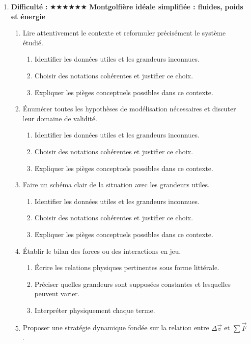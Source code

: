 \documentclass[11pt,a4paper]{article}
\newcommand{\etoiles}[1]{\textbf{Difficulté : }#1}
\begin{document}
\begin{enumerate}[label=\textbf{Très long \arabic*.},leftmargin=*]
\begin{enumerate}[label=\textbf{\arabic*)}]
\begin{enumerate}[label=\alph*)]
\end{enumerate}
\end{enumerate}
\item \etoiles{★★★★★★}
\textbf{Montgolfière idéale simplifiée : fluides, poids et énergie}
\begin{enumerate}[label=\textbf{\arabic*)}]
\item Lire attentivement le contexte et reformuler précisément le système étudié.
\begin{enumerate}[label=\alph*)]
\item Identifier les données utiles et les grandeurs inconnues.
\item Choisir des notations cohérentes et justifier ce choix.
\item Expliquer les pièges conceptuels possibles dans ce contexte.
\end{enumerate}
\item Énumérer toutes les hypothèses de modélisation nécessaires et discuter leur domaine de validité.
\begin{enumerate}[label=\alph*)]
\item Identifier les données utiles et les grandeurs inconnues.
\item Choisir des notations cohérentes et justifier ce choix.
\item Expliquer les pièges conceptuels possibles dans ce contexte.
\end{enumerate}
\item Faire un schéma clair de la situation avec les grandeurs utiles.
\begin{enumerate}[label=\alph*)]
\item Identifier les données utiles et les grandeurs inconnues.
\item Choisir des notations cohérentes et justifier ce choix.
\item Expliquer les pièges conceptuels possibles dans ce contexte.
\end{enumerate}
\item Établir le bilan des forces ou des interactions en jeu.
\begin{enumerate}[label=\alph*)]
\item Écrire les relations physiques pertinentes sous forme littérale.
\item Préciser quelles grandeurs sont supposées constantes et lesquelles peuvent varier.
\item Interpréter physiquement chaque terme.
\end{enumerate}
\item Proposer une stratégie dynamique fondée sur la relation entre $\Delta\vec v$ et $\sum\vec F$.

\end{enumerate}
\end{enumerate}
\end{document}
